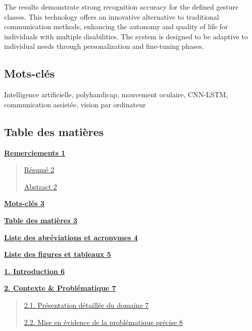 \documentclass[
]{article}
\begin{document}
The results demonstrate strong recognition accuracy for the defined gesture classes. This technology offers an innovative alternative to traditional communication methods, enhancing the autonomy and quality of life for individuals with multiple disabilities. The system is designed to be adaptive to individual needs through personalization and fine-tuning phases.

\hypertarget{mots-cluxe9s}{%
\subsection{Mots-clés}\label{mots-cluxe9s}}

Intelligence artificielle, polyhandicap, mouvement oculaire, CNN-LSTM, communication assistée, vision par ordinateur

\hypertarget{table-des-matiuxe8res}{%
\subsection{Table des matières}\label{table-des-matiuxe8res}}

\protect\hyperlink{remerciements}{\textbf{Remerciements 1}}

\begin{quote}
\protect\hyperlink{ruxe9sumuxe9}{Résumé 2}

\protect\hyperlink{abstract}{Abstract 2}
\end{quote}

\protect\hyperlink{mots-cluxe9s}{\textbf{Mots-clés 3}}

\protect\hyperlink{table-des-matiuxe8res}{\textbf{Table des matières 3}}

\protect\hyperlink{liste-des-abruxe9viations-et-acronymes}{\textbf{Liste des abréviations et acronymes 4}}

\protect\hyperlink{liste-des-figures-et-tableaux}{\textbf{Liste des figures et tableaux 5}}

\protect\hyperlink{introduction}{\textbf{1. Introduction 6}}

\protect\hyperlink{contexte-probluxe9matique}{\textbf{2. Contexte \& Problématique 7}}

\begin{quote}
\protect\hyperlink{pruxe9sentation-duxe9tailluxe9e-du-domaine}{2.1. Présentation détaillée du domaine 7}

\protect\hyperlink{mise-en-uxe9vidence-de-la-probluxe9matique-pruxe9cise}{2.2. Mise en évidence de la problématique précise 8}
\end{quote}
\end{document}

